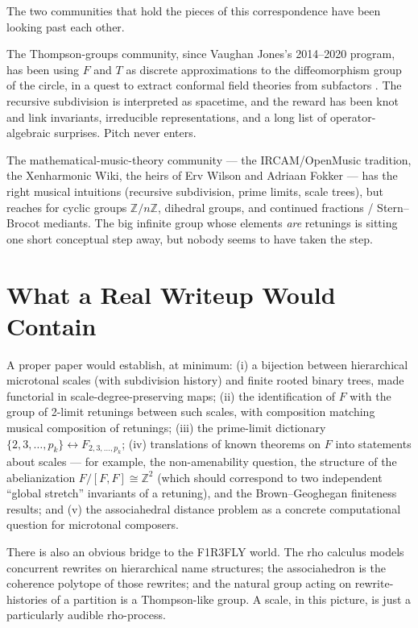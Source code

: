 \documentclass[11pt]{article}
\begin{document}
The two communities that hold the pieces of this correspondence have been looking past each other.

The Thompson-groups community, since Vaughan Jones's 2014--2020 program, has been using $F$ and $T$ as discrete approximations to the diffeomorphism group of the circle, in a quest to extract conformal field theories from subfactors \cite{Jones}. The recursive subdivision is interpreted as spacetime, and the reward has been knot and link invariants, irreducible representations, and a long list of operator-algebraic surprises. Pitch never enters.

The mathematical-music-theory community --- the IRCAM/OpenMusic tradition, the Xenharmonic Wiki, the heirs of Erv Wilson and Adriaan Fokker --- has the right musical intuitions (recursive subdivision, prime limits, scale trees), but reaches for cyclic groups $\mathbb{Z}/n\mathbb{Z}$, dihedral groups, and continued fractions / Stern--Brocot mediants. The big infinite group whose elements \emph{are} retunings is sitting one short conceptual step away, but nobody seems to have taken the step.

\section{What a Real Writeup Would Contain}

A proper paper would establish, at minimum: (i) a bijection between hierarchical microtonal scales (with subdivision history) and finite rooted binary trees, made functorial in scale-degree-preserving maps; (ii) the identification of $F$ with the group of 2-limit retunings between such scales, with composition matching musical composition of retunings; (iii) the prime-limit dictionary $\{2,3,\ldots,p_k\} \leftrightarrow F_{2,3,\ldots,p_k}$; (iv) translations of known theorems on $F$ into statements about scales --- for example, the non-amenability question, the structure of the abelianization $F/[F,F] \cong \mathbb{Z}^2$ (which should correspond to two independent ``global stretch'' invariants of a retuning), and the Brown--Geoghegan finiteness results; and (v) the associahedral distance problem as a concrete computational question for microtonal composers.

There is also an obvious bridge to the F1R3FLY world. The rho calculus models concurrent rewrites on hierarchical name structures; the associahedron is the coherence polytope of those rewrites; and the natural group acting on rewrite-histories of a partition is a Thompson-like group. A scale, in this picture, is just a particularly audible rho-process.
\end{document}
